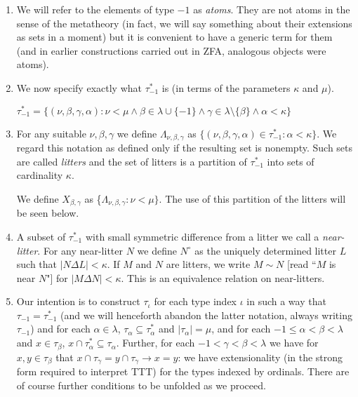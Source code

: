 \documentclass[12pt]{article}
\begin{document}
\begin{enumerate}
\item We will refer to the elements of type $-1$ as {\em atoms\/}.  They are not atoms in the sense of the metatheory (in fact, we will say something about their extensions as sets in a moment) but it is convenient to have a generic term for them (and in earlier constructions carried out in ZFA, analogous objects were atoms).

\item We now specify exactly what $\tau^*_{-1}$ is (in terms of the parameters $\kappa$ and $\mu$).

$\tau^*_{-1}= \{(\nu,\beta,\gamma,\alpha):\nu<\mu \wedge  \beta \in \lambda\cup \{-1\} \wedge \gamma \in \lambda \setminus \{\beta\}\wedge \alpha<\kappa\}$

\item For any suitable $\nu, \beta, \gamma$ we define $\Lambda_{\nu,\beta,\gamma}$ as $\{(\nu,\beta,\gamma,\alpha)\in \tau^*_{-1}:\alpha<\kappa\}$.  We regard this notation as defined
only if the resulting set is nonempty.  Such sets are called {\em litters} and the set of litters is a partition of $\tau^*_{-1}$ into sets of cardinality $\kappa$.

We define $X_{\beta,\gamma}$ as \{$\Lambda_{\nu,\beta,\gamma}:\nu<\mu\}$.  The use of this partition of the litters will be seen below.

\item A subset of $\tau^*_{-1}$ with small symmetric difference from a litter we call a {\em near-litter\/}.  For any near-litter $N$ we define $N^\circ$ as the uniquely determined litter $L$
such that $|N \Delta L|<\kappa$.  If $M$ and $N$ are litters, we write $M \sim N$ [read ``$M$ is near $N$"] for $|M \Delta N| < \kappa$.  This is an equivalence relation on near-litters.

\item Our intention is to construct $\tau_\iota$ for each type index $\iota$ in such a way that $\tau_{-1} = \tau^*_{-1}$ (and we will henceforth abandon the latter notation, always writing $\tau_{-1}$)
and for each $\alpha \in \lambda$, $\tau_\alpha \subseteq \tau^*_\alpha$ and $|\tau_\alpha| = \mu$, and for each $-1 \leq \alpha < \beta <\lambda$ and $x \in \tau_\beta$,
$x \cap \tau^*_\alpha\subseteq \tau_\alpha$.   Further, for each $-1<\gamma<\beta<\lambda$ we
have for $x,y \in \tau_\beta$ that $x \cap \tau_\gamma = y \cap \tau_\gamma \rightarrow x=y$:  we have extensionality (in the strong form required to interpret TTT)  for the types indexed by ordinals.  There are of course further conditions to be unfolded as we proceed.


\end{enumerate}
\end{document}
